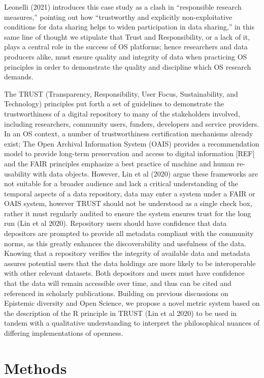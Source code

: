 \documentclass{article}
\begin{document}
Leonelli (2021) introduces this case study as a clash in ``responsible
research measures,'' pointing out how ``trustworthy and explicitly
non-exploitative conditions for data sharing helps to widen
participation in data sharing,'' in this same line of thought we
stipulate that Trust and Responsibility, or a lack of it, plays a
central role in the success of OS platforms; hence researchers and data
producers alike, must ensure quality and integrity of data when
practicing OS principles in order to demonstrate the quality and
discipline which OS research demands.

The TRUST (Transparency, Responsibility, User Focus, Sustainability, and
Technology) principles put forth a set of guidelines to demonstrate the
trustworthiness of a digital repository to many of the stakeholders
involved, including researchers, community users, funders, developers
and service providers. In an OS context, a number of trustworthiness
certification mechanisms already exist; The Open Archival Information
System (OAIS) provides a recommendation model to provide long-term
preservation and access to digital information {[}REF{]} and the FAIR
principles emphasize a best practice of machine and human re-usability
with data objects. However, Lin et al (2020) argue these frameworks are
not suitable for a broader audience and lack a critical understanding of
the temporal aspects of a data repository, data may enter a system under
a FAIR or OAIS system, however TRUST should not be understood as a
single check box, rather it must regularly audited to ensure the system
ensures trust for the long run (Lin et al 2020). Repository users should
have confidence that data depositors are prompted to provide all
metadata compliant with the community norms, as this greatly enhances
the discoverability and usefulness of the data. Knowing that a
repository verifies the integrity of available data and metadata assures
potential users that the data holdings are more likely to be
interoperable with other relevant datasets. Both depositors and users
must have confidence that the data will remain accessible over time, and
thus can be cited and referenced in scholarly publications. Building on
previous discussions on Epistemic diversity and Open Science, we propose
a novel metric system based on the description of the R principle in
TRUST (Lin et al 2020) to be used in tandem with a qualitative
understanding to interpret the philosophical nuances of differing
implementations of openness.

\hypertarget{methods}{%
\section{Methods}\label{methods}}
\end{document}
